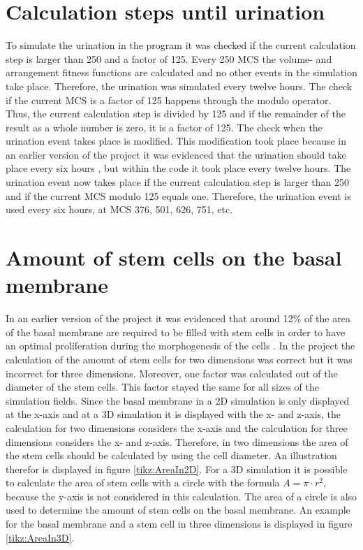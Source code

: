 \section{Calculation steps until urination}\label{sec:calculationStpesUntilUrination}
To simulate the urination in the program it was checked if the current calculation step is larger than 250 and a factor of 125. Every 250 \ac{MCS} the volume- and arrangement fitness functions are calculated and no other events in the simulation take place. Therefore, the urination was simulated every twelve hours. The check if the current \ac{MCS} is a factor of 125 happens through the modulo operator. Thus, the current calculation step is divided by 125 and if the remainder of the result as a whole number is zero, it is a factor of 125. \newline
The check when the urination event takes place is modified. This modification took place because in an earlier version of the project it was evidenced that the urination should take place every six hours \cite{Torelli2017}, but within the code it took place every twelve hours. The urination event now takes place if the current calculation step is larger than 250 and if the current \ac{MCS} modulo 125 equals one. Therefore, the urination event is used every six hours, at \ac{MCS} 376, 501, 626, 751, etc.


\section{Amount of stem cells on the basal membrane}\label{sec:AmountStemCellsBasalMembrane}
In an earlier version of the project it was evidenced that around 12\% of the area of the basal membrane are required to be filled with stem cells in order to have an optimal proliferation during the morphogenesis of the cells \cite{Torelli2017}.
In the project the calculation of the amount of stem cells for two dimensions was correct but it was incorrect for three dimensions. Moreover, one factor was calculated out of the diameter of the stem cells. This factor stayed the same for all sizes of the simulation fields. \newline
Since the basal membrane in a 2D simulation is only displayed at the x-axis and at a 3D simulation it is displayed with the x- and z-axis, the calculation for two dimensions considers the x-axis and the calculation for three dimensions considers the x- and z-axis. Therefore, in two dimensions the area of the stem cells should be calculated by using the cell diameter. An illustration therefor is displayed in figure \ref{tikz:AreaIn2D}. For a 3D simulation it is possible to calculate the area of stem cells with a circle with the formula $A = \pi \cdot r^{2}$, because the y-axis is not considered in this calculation. The area of a circle is also used to determine the amount of stem cells on the basal membrane. An example for the basal membrane and a stem cell in three dimensions is displayed in figure \ref{tikz:AreaIn3D}. 

